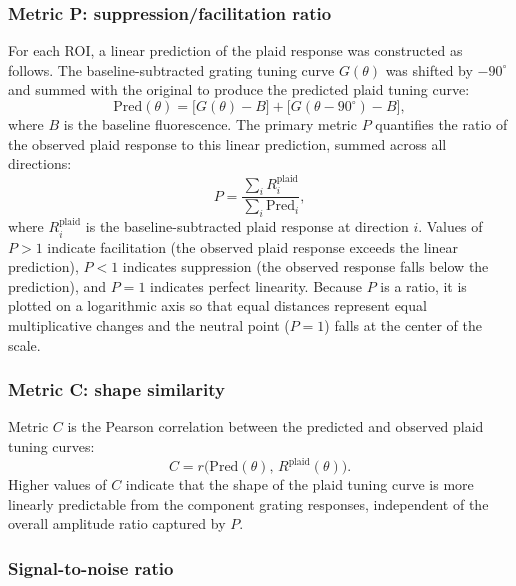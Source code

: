 \documentclass[11pt,letterpaper]{article}
\begin{document}
\subsubsection{Metric P: suppression/facilitation ratio}

For each ROI, a linear prediction of the plaid response was constructed as
follows. The baseline-subtracted grating tuning curve $G(\theta)$ was shifted
by $-90^{\circ}$ and summed with the original to produce the predicted plaid
tuning curve:
\begin{equation}
  \text{Pred}(\theta) = \bigl[G(\theta) - B\bigr]
    + \bigl[G(\theta - 90^{\circ}) - B\bigr],
  \label{eq:prediction}
\end{equation}
where $B$ is the baseline fluorescence. The primary metric $P$ quantifies the
ratio of the observed plaid response to this linear prediction, summed across
all directions:
\begin{equation}
  P = \frac{\sum_{i} R_i^{\text{plaid}}}{\sum_{i} \text{Pred}_i},
  \label{eq:P}
\end{equation}
where $R_i^{\text{plaid}}$ is the baseline-subtracted plaid response at
direction $i$. Values of $P > 1$ indicate facilitation (the observed plaid
response exceeds the linear prediction), $P < 1$ indicates suppression
(the observed response falls below the prediction), and $P = 1$ indicates
perfect linearity. Because $P$ is a ratio, it is plotted on a logarithmic
axis so that equal distances represent equal multiplicative changes and the
neutral point ($P = 1$) falls at the center of the scale.

\subsubsection{Metric C: shape similarity}

Metric $C$ is the Pearson correlation between the predicted and observed plaid
tuning curves:
\begin{equation}
  C = r\bigl(\text{Pred}(\theta),\, R^{\text{plaid}}(\theta)\bigr).
  \label{eq:C}
\end{equation}
Higher values of $C$ indicate that the shape of the plaid tuning curve is
more linearly predictable from the component grating responses, independent of
the overall amplitude ratio captured by $P$.

\subsubsection{Signal-to-noise ratio}
\end{document}
